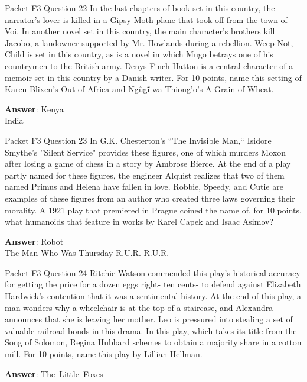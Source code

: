 \begin{frame}{Packet F3 Question 22}
In the last chapters of book set in this country, the narrator’s lover is killed in a Gipsy Moth plane that took off from the town of Voi. In another novel set in this country, the main character’s brothers kill Jacobo, a landowner supported by Mr. Howlands during a rebellion. Weep Not, Child is set in this country, as is a novel in which Mugo betrays one of his countrymen to the   British army. Denys Finch Hatton is a central   character of a memoir set in this country by a Danish writer. For 10 points, name this setting of Karen Blixen’s Out of Africa and Ngũgĩ wa Thiong’o’s A   Grain of Wheat.  

\textbf{Answer}: Kenya\\
 India
\end{frame}

\begin{frame}{Packet F3 Question 23}
In G.K. Chesterton’s “The   Invisible Man,`` Isidore Smythe’s ''Silent Service" provides these figures, one of which murders Moxon after losing a game of chess in a story by Ambrose Bierce. At the end of a play partly named for these figures, the   engineer Alquist realizes that two of them named Primus and Helena have fallen in love. Robbie, Speedy, and Cutie are examples of these figures from an author who created three laws governing their morality. A 1921 play that premiered in Prague coined the name of, for 10 points, what humanoids that feature in works by Karel Capek and Isaac   Asimov?  

\textbf{Answer}: Robot\\
 The Man Who Was Thursday
 R.U.R.
 R.U.R.
\end{frame}

\begin{frame}{Packet F3 Question 24}
Ritchie Watson commended this play's historical accuracy for getting the price for a dozen eggs right- ten cents- to defend against Elizabeth Hardwick’s contention that it was a sentimental history. At the end of this play, a man wonders why a wheelchair is at the top of a staircase, and Alexandra announces that she is leaving her mother. Leo is pressured into stealing a set of valuable railroad bonds in this drama. In this play, which takes its title from the Song of Solomon, Regina Hubbard schemes     to obtain a majority share in a cotton mill. For 10 points,     name this play by Lillian Hellman.

\textbf{Answer}: The\ Little\ Foxes\\
\end{frame}

